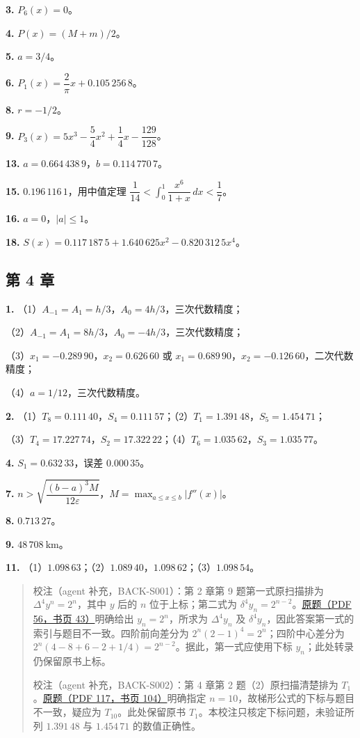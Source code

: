 \textbf{3.} \(P_6(x)=0\)。

\textbf{4.} \(P(x)=(M+m)/2\)。

\textbf{5.} \(a=3/4\)。

\textbf{6.} \(P_1(x)=\dfrac{2}{\pi}x+0.105\,256\,8\)。

\textbf{8.} \(r=-1/2\)。

\textbf{9.} \(P_3(x)=5x^3-\dfrac{5}{4}x^2+\dfrac{1}{4}x-\dfrac{129}{128}\)。

\textbf{13.} \(a=0.664\,438\,9\)，\(b=0.114\,770\,7\)。

\textbf{15.} \(0.196\,116\,1\)，用中值定理 \(\dfrac{1}{14}<\displaystyle\int_0^1\dfrac{x^6}{1+x}\,dx<\dfrac{1}{7}\)。

\textbf{16.} \(a=0\)，\(|a|\leqslant1\)。

\textbf{18.} \(S(x)=0.117\,187\,5+1.640\,625x^2-0.820\,312\,5x^4\)。

\subsection{第 4 章}\label{back-ux7b2c-4-ux7ae0}

\textbf{1.} （1）\(A_{-1}=A_1=h/3\)，\(A_0=4h/3\)，三次代数精度；

（2）\(A_{-1}=A_1=8h/3\)，\(A_0=-4h/3\)，三次代数精度；

（3）\(x_1=-0.289\,90\)，\(x_2=0.626\,60\) 或 \(x_1=0.689\,90\)，\(x_2=-0.126\,60\)，二次代数精度；

（4）\(a=1/12\)，三次代数精度。

\textbf{2.} （1）\(T_8=0.111\,40\)，\(S_4=0.111\,57\)；（2）\(T_1=1.391\,48\)，\(S_5=1.454\,71\)；

（3）\(T_4=17.227\,74\)，\(S_2=17.322\,22\)；（4）\(T_6=1.035\,62\)，\(S_3=1.035\,77\)。

\textbf{4.} \(S_1=0.632\,33\)，误差 \(0.000\,35\)。

\textbf{7.} \(n>\sqrt{\dfrac{(b-a)^3M}{12\varepsilon}}\)，\(M=\displaystyle\max_{a\leqslant x\leqslant b}|f''(x)|\)。

\textbf{8.} \(0.713\,27\)。

\textbf{9.} \(48\,708\ \mathrm{km}\)。

\textbf{11.} （1）\(1.098\,63\)；（2）\(1.089\,40\)，\(1.098\,62\)；（3）\(1.098\,54\)。

\begin{quote}
校注（agent 补充，BACK-S001）：第 2 章第 9 题第一式原扫描排为 \(\Delta^4y^n=2^n\)，其中 \(y\) 后的 \(n\) 位于上标；第二式为 \(\delta^4y_n=2^{n-2}\)。\href{source-images/pdf-056.jpeg}{原题（PDF 56，书页 43）}明确给出 \(y_n=2^n\)，所求为 \(\Delta^4y_n\) 及 \(\delta^4y_n\)，因此答案第一式的索引与题目不一致。四阶前向差分为 \(2^n(2-1)^4=2^n\)；四阶中心差分为 \(2^n(4-8+6-2+1/4)=2^{n-2}\)。据此，第一式应使用下标 \(y_n\)；此处转录仍保留原书上标。

校注（agent 补充，BACK-S002）：第 4 章第 2 题（2）原扫描清楚排为 \(T_1\)。\href{source-images/pdf-117.jpeg}{原题（PDF 117，书页 104）}明确指定 \(n=10\)，故梯形公式的下标与题目不一致，疑应为 \(T_{10}\)。此处保留原书 \(T_1\)。本校注只核定下标问题，未验证所列 \(1.391\,48\) 与 \(1.454\,71\) 的数值正确性。
\end{quote}

